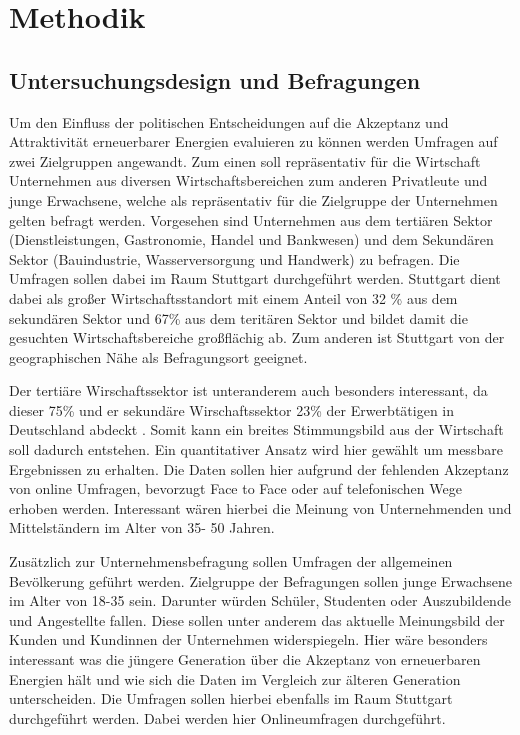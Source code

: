 \documentclass[12pt,a4paper]{article}
\begin{document}
\section*{Methodik}
\subsection*{Untersuchungsdesign und Befragungen }
Um den Einfluss der politischen Entscheidungen auf die Akzeptanz und Attraktivität 
erneuerbarer Energien evaluieren zu können werden Umfragen auf zwei Zielgruppen angewandt. 
Zum einen soll repräsentativ für die Wirtschaft Unternehmen aus diversen Wirtschaftsbereichen 
zum anderen Privatleute und junge Erwachsene, welche als repräsentativ für die Zielgruppe der Unternehmen 
gelten befragt werden. Vorgesehen sind Unternehmen aus dem tertiären Sektor 
(Dienstleistungen, Gastronomie, Handel und Bankwesen) und dem Sekundären Sektor
(Bauindustrie, Wasserversorgung und Handwerk)  zu befragen. 
Die Umfragen sollen dabei im Raum Stuttgart durchgeführt werden. Stuttgart dient dabei als großer 
Wirtschaftsstandort mit einem Anteil von 32 \% aus dem sekundären Sektor und 67\% aus 
dem teritären Sektor \autocite{stuttgart:2023} und bildet damit die gesuchten Wirtschaftsbereiche großflächig ab. 
Zum anderen ist Stuttgart von der geographischen Nähe als Befragungsort geeignet.

Der tertiäre Wirschaftssektor ist unteranderem auch besonders interessant,
da dieser 75\% und er sekundäre Wirschaftssektor 23\% der Erwerbtätigen in Deutschland
abdeckt \autocite{workers:2022}. 
Somit kann ein breites Stimmungsbild aus der Wirtschaft soll dadurch entstehen. 
Ein quantitativer Ansatz wird hier gewählt um messbare Ergebnissen zu erhalten. 
Die Daten sollen hier aufgrund der fehlenden Akzeptanz von online Umfragen, 
bevorzugt Face to Face oder auf telefonischen Wege erhoben werden.
Interessant wären hierbei die Meinung von Unternehmenden und Mittelständern im Alter von 35- 50 Jahren.

Zusätzlich zur Unternehmensbefragung sollen Umfragen der allgemeinen Bevölkerung geführt werden. 
Zielgruppe der Befragungen sollen junge Erwachsene im Alter von 18-35 sein. Darunter würden Schüler, 
Studenten oder Auszubildende und Angestellte fallen. Diese sollen unter anderem das aktuelle Meinungsbild 
der Kunden und Kundinnen der Unternehmen widerspiegeln. Hier wäre besonders interessant was die jüngere Generation 
über die Akzeptanz von erneuerbaren Energien hält und wie sich die Daten im Vergleich zur älteren Generation unterscheiden. 
Die Umfragen sollen hierbei ebenfalls im Raum Stuttgart durchgeführt werden. Dabei werden hier Onlineumfragen durchgeführt. 
\end{document}
